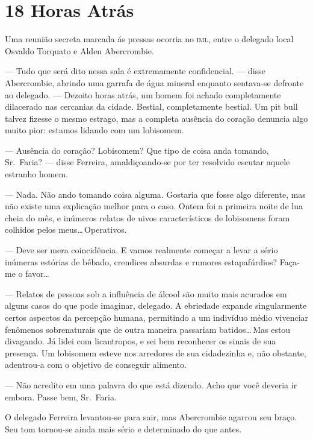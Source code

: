 \chapter{18 Horas Atrás}


Uma reunião secreta marcada ás pressas ocorria no \textsc{iml}, entre o
delegado local Osvaldo Torquato e Alden Abercrombie.

--- Tudo que será dito nessa sala é extremamente confidencial. --- disse
Abercrombie, abrindo uma garrafa de água mineral enquanto sentava-se
defronte ao delegado. --- Dezoito horas atrás, um homem foi achado
completamente dilacerado nas cercanias da cidade. Bestial, completamente
bestial. Um pit bull talvez fizesse o mesmo estrago, mas a completa
ausência do coração denuncia algo muito pior: estamos lidando com um
lobisomem.

--- Ausência do coração? Lobisomem? Que tipo de coisa anda tomando,
Sr.~Faria? --- disse Ferreira, amaldiçoando-se por ter resolvido escutar
aquele estranho homem.

--- Nada. Não ando tomando coisa alguma. Gostaria que fosse algo
diferente, mas não existe uma explicação melhor para o caso. Ontem foi a
primeira noite de lua cheia do mês, e inúmeros relatos de uivos
característicos de lobisomens foram colhidos pelos
meus\ldots\,Operativos.

--- Deve ser mera coincidência. E vamos realmente começar a levar a
sério inúmeras estórias de bêbado, crendices absurdas e rumores
estapafúrdios? Faça-me o favor\ldots

--- Relatos de pessoas sob a influência de álcool são muito mais
acurados em alguns casos do que pode imaginar, delegado. A ebriedade
expande singularmente certos aspectos da percepção humana, permitindo a
um indivíduo médio vivenciar fenômenos sobrenaturais que de outra
maneira passariam batidos\ldots\,Mas estou divagando. Já lidei com
licantropos, e sei bem reconhecer os sinais de sua presença. Um
lobisomem esteve nos arredores de sua cidadezinha e, não obstante,
adentrou-a com o objetivo de conseguir alimento.

--- Não acredito em uma palavra do que está dizendo. Acho que você
deveria ir embora. Passe bem, Sr.~Faria.

O delegado Ferreira levantou-se para sair, mas Abercrombie agarrou seu
braço. Seu tom tornou-se ainda mais sério e determinado do que antes.

